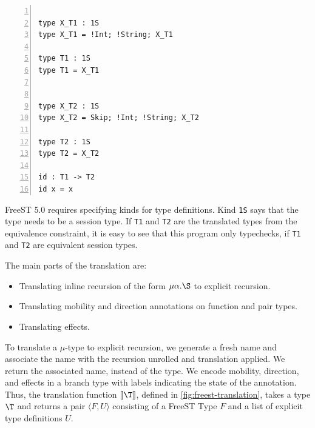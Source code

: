 \begin{lstlisting}[numbers=left]

type X_T1 : 1S
type X_T1 = !Int; !String; X_T1

type T1 : 1S
type T1 = X_T1


type X_T2 : 1S
type X_T2 = Skip; !Int; !String; X_T2

type T2 : 1S
type T2 = X_T2

id : T1 -> T2
id x = x
\end{lstlisting}

FreeST 5.0 requires specifying kinds for type definitions. 
Kind \lstinline|1S| says that the type needs to be a session type. 
If \lstinline|T1| and \lstinline|T2| are the translated types from the equivalence constraint, 
it is easy to see that this program only typechecks, if \lstinline|T1| and
\lstinline|T2| are equivalent session types.

The main parts of the translation are:
\begin{itemize}
  \item Translating inline recursion of the form $\mu\alpha.\S$ to explicit recursion.
  \item Translating mobility and direction annotations on function and pair
    types.
  \item Translating effects.
\end{itemize}


To translate a $\mu$-type to explicit recursion, we generate a fresh name and
associate the name with the recursion unrolled and translation applied.
We return the associated name, instead of the type.
We encode mobility, direction, and effects in a branch type with labels
indicating the state of the annotation.
Thus, the translation function $\tofreest{\T}$, defined in
\cref{fig:freest-translation}, takes a type $\T$ and returns a pair
$\langle F,U\rangle$ consisting of a FreeST Type $F$ and a list of explicit
type definitions $U$.

